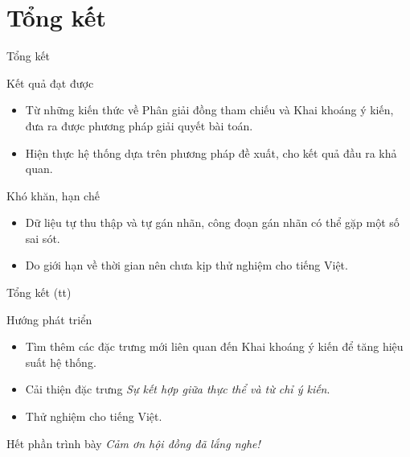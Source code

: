 \documentclass[9pt,xcolor=table,hyperref=unicode]{beamer}
\begin{document}
	\section{Tổng kết}
		\begin{frame}{Tổng kết}			
			\begin{block}{Kết quả đạt được}
				\begin{itemize}
					\item Từ những kiến thức về Phân giải đồng tham chiếu và Khai khoáng ý kiến, đưa ra được phương pháp giải quyết bài toán.
					\item Hiện thực hệ thống dựa trên phương pháp đề xuất, cho kết quả đầu ra khả quan.				
				\end{itemize}
			\end{block}
			\begin{block}{Khó khăn, hạn chế}
				\begin{itemize}
					\item Dữ liệu tự thu thập và tự gán nhãn, công đoạn gán nhãn có thể gặp một số sai sót. 
					\item Do giới hạn về thời gian nên chưa kịp thử nghiệm cho tiếng Việt.				
				\end{itemize}
			\end{block}
		\end{frame}
	
		\begin{frame}{Tổng kết (tt)}			
			\begin{block}{Hướng phát triển}
				\begin{itemize}
					\item Tìm thêm các đặc trưng mới liên quan đến Khai khoáng ý kiến để tăng hiệu suất hệ thống.
					\item Cải thiện đặc trưng \textit{Sự kết hợp giữa thực thể và từ chỉ ý kiến}.
					\item Thử nghiệm cho tiếng Việt.
				\end{itemize}
			\end{block}
		\end{frame}

		\begin{frame}{Hết phần trình bày}
			\Huge
			\centering
			\fontsize{35pt}{35}\selectfont
			\textit{Cảm ơn hội đồng đã lắng nghe!}			
		\end{frame}
\end{document}
